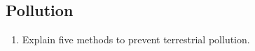 \subsection{Pollution}

\begin{enumerate}
	\item Explain five methods to prevent terrestrial pollution. 
	
\end{enumerate}



